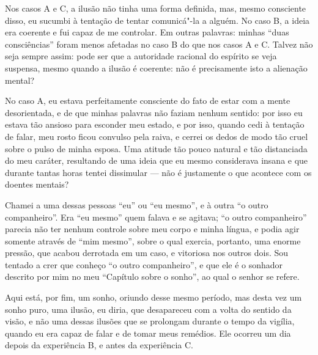 Nos casos A e C, a ilusão não tinha uma forma definida, mas, mesmo
consciente disso, eu sucumbi à tentação de tentar comunicá"-la a alguém.
 No caso B, a ideia era coerente e fui capaz de me controlar.  Em
outras palavras: minhas “duas consciências” foram menos afetadas no
caso B do que nos casos A e C.  Talvez não seja sempre assim: pode ser
que a autoridade racional do espírito se veja suspensa, mesmo quando a
ilusão é coerente: não é precisamente isto a alienação mental?

No caso A, eu estava perfeitamente consciente do fato de estar com a
mente desorientada, e de que minhas palavras não faziam nenhum sentido:
por isso eu estava tão ansioso para esconder meu estado, e por isso,
quando cedi à tentação de falar, meu rosto ficou convulso pela raiva, e
cerrei os dedos de modo tão cruel sobre o pulso de minha esposa.  Uma
atitude tão pouco natural e tão distanciada do meu caráter, resultando
de uma ideia que eu mesmo considerava insana e que durante tantas horas
tentei dissimular --- não é justamente o que acontece com os doentes
mentais?

Chamei a uma dessas pessoas “eu” ou “eu mesmo”, e à outra “o outro
companheiro”.  Era “eu mesmo” quem falava e se agitava; “o outro
companheiro” parecia não ter nenhum controle sobre meu corpo e minha
língua, e podia agir somente através de “mim mesmo”, sobre o qual
exercia, portanto, uma enorme pressão, que acabou derrotada em um caso,
e vitoriosa nos outros dois.  Sou tentado a crer que conheço “o outro
companheiro”, e que ele é o sonhador descrito por mim no meu “Capítulo
sobre o sonho”, ao qual o senhor se refere.

Aqui está, por fim, um sonho, oriundo desse mesmo período, mas desta vez
um sonho puro, uma ilusão, eu diria, que desapareceu com a volta do		\EP[-1]
sentido da visão, e não uma dessas ilusões que se prolongam durante o
tempo da vigília, quando eu era capaz de falar e de tomar meus
remédios.  Ele ocorreu um dia depois da experiência B, e antes da
experiência C.

